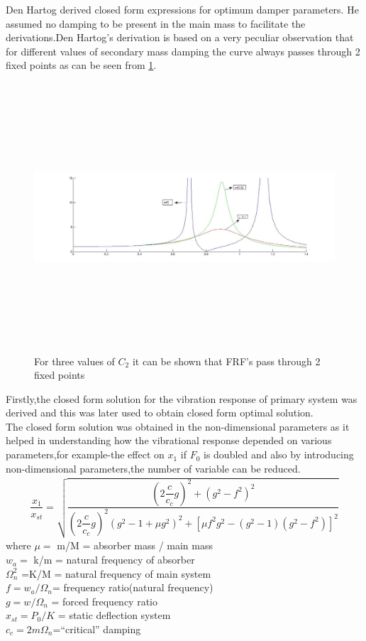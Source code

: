 Den Hartog derived closed form expressions for optimum damper parameters. He assumed no damping to be present in the main mass to facilitate the derivations.Den Hartog’s derivation is based on a very peculiar observation that for different values of secondary mass damping the curve always passes through 2 fixed points as can be seen from \ref{fig:4}.
\begin{figure}[h]
\includegraphics[width=16cm,height=10cm]{"figures/4"}
\caption{For three values of $C_{2}$ it can be shown that FRF's pass through 2 fixed points}
  \label{fig:4}
\end{figure}
Firstly,the closed form solution for the vibration response of  primary system was derived and this was later used to obtain closed form optimal solution.\\The closed form solution was obtained in the non-dimensional parameters as it helped in understanding how the vibrational response depended on various parameters,for example-the effect on $x_1$ if $F_0$ is doubled and also by introducing non-dimensional parameters,the number of variable can be reduced.
\begin{align}
\dfrac{x_1}{x_{st}} = \sqrt{\dfrac{(2\dfrac{c}{c_c}g)^2 + (g^2 - f^2)^2}{(2\dfrac{c}{c_c}g)^2 (g^2 -1 + \mu g^2)^2 + [\mu f^2 g^2 - (g^2 -1)(g^2-f^2)]^2}} 
\end{align}
where 
$\mu = $ m/M =  absorber mass / main mass \\
$w_a = $ k/m =  natural frequency of absorber \\
$\Omega_n^2 $ =K/M = natural frequency of main system\\
$f =w_a/\Omega_n$= frequency ratio(natural frequency)\\
$g = w/\Omega_n$ = forced frequency ratio \\
$x_{st} = P_0/K$ = static deflection system \\
$c_c = 2m\Omega_n $=``critical''   damping\\

